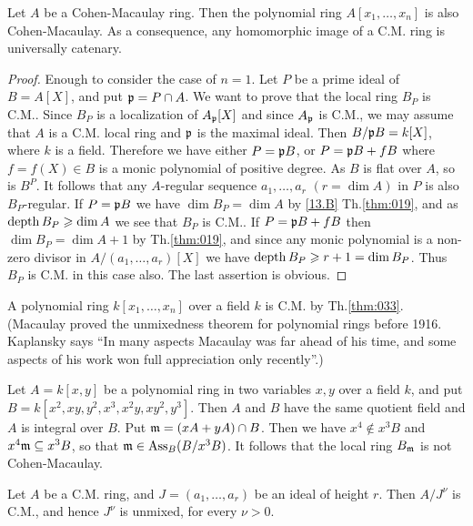 \documentclass[../main]{subfiles}
\begin{document}
\begin{partheorem}\label{thm:033}
Let $A$ be a Cohen-Macaulay ring. Then the polynomial ring $A[x_1, \ldots, x_n]$ is also Cohen-Macaulay. As a consequence, any homomorphic image of a C.M. ring is universally catenary.
\end{partheorem} 

\begin{proof}
Enough to consider the case of $n=1$. Let $P$ be a prime ideal of $B=A[X]$, and put $\mathfrak{p}=P \cap A$. We want to prove that the local ring $B_P$ is C.M.. Since $B_P$ is a localization of $A_{\mathfrak{p}}[X]$ and since $A_{\mathfrak{p}}$ is C.M., we may assume that $A$ is a C.M. local ring and $\mathfrak{p}$ is the maximal ideal. Then $B / \mathfrak{p} B=k[X]$, where $k$ is a field. Therefore we have either $P=\mathfrak{p}B$, or $P=\mathfrak{p}B+f B$ where $f=f(X) \in B$ is a monic polynomial of positive degree. As $B$ is flat over $A$, so is $B^P$. It follows that any $A$-regular sequence $a_1, \ldots, a_r$ $(r=\dim A)$ in $P$ is also $B_P$-regular. If $P=\mathfrak{p}B$ we have $\dim B_P=\dim A$ by \ref{13.B} Th.\ref{thm:019}, and as $\operatorname{depth} B_P \geqslant \operatorname{dim} A$ we see that $B_P$ is C.M.. If $P=\mathfrak{p}B+f B$ then $\dim B_P=\dim A+1$ by Th.\ref{thm:019}, and since any monic polynomial is a non-zero divisor in $A /(a_1, \ldots, a_r)[X]$ we have $\operatorname{depth} B_P \geqslant r+1=\operatorname{dim} B_P$. Thus $B_P$ is C.M. in this case also. The last assertion is obvious.
\end{proof}

\begin{parexample}
A polynomial ring $k[x_1, \ldots, x_n]$ over a field $k$ is C.M. by Th.\ref{thm:033}. (Macaulay proved the unmixedness theorem for polynomial rings before 1916. Kaplansky says ``In many aspects Macaulay was far ahead of his time, and some aspects of his work won full appreciation only recently''.)
\end{parexample}

\begin{example}
Let $A=k[x, y]$ be a polynomial ring in two variables $x,y$ over a field $k$, and put $B=k[x^2, x y, y^2, x^3, x^2 y,x y^2, y^3]$. Then $A$ and $B$ have the same quotient field and $A$ is integral over $B$. Put $\mathfrak{m}=(x A+y A) \cap B$. Then we have $x^4 \notin x^3 B$ and $x^4 \mathfrak{m} \subseteq x^3 B$, so that $\mathfrak{m} \in\operatorname{Ass}_B(B / x^3 B)$. It follows that the local ring $B_{\mathfrak{m}}$ is not Cohen-Macaulay.
\end{example}

\begin{parproposition}
Let $A$ be a C.M. ring, and $J=(a_1,\ldots, a_r)$ be an ideal of height $r$. Then $A / J^\nu$ is C.M., and hence $J^\nu$ is unmixed, for every $\nu>0$. 
\end{parproposition}
\end{document}
